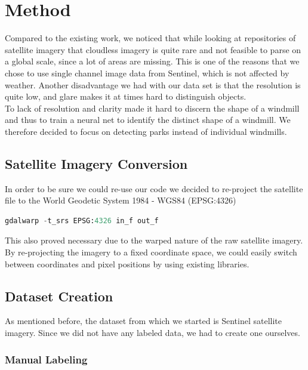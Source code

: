 \section{Method}
%

Compared to the existing work, we noticed that while looking at repositories of satellite imagery that cloudless imagery is quite rare and not feasible to parse on a global scale, since a lot of areas are missing. This is one of the reasons that we chose to use single channel image data from Sentinel, which is not affected by weather. Another disadvantage we had with our data set is that the resolution is quite low, and glare makes it at times hard to distinguish objects. \\

To lack of resolution and clarity made it hard to discern the shape of a windmill and thus to train a neural net to identify the distinct shape of a windmill. We therefore decided to focus on detecting parks instead of individual windmills.

\subsection{Satellite Imagery Conversion}

In order to be sure we could re-use our code we decided to re-project the satellite file to the World Geodetic System 1984 - WGS84 (EPSG:4326) 

\begin{lstlisting}[language=Python,breaklines=true]
gdalwarp -t_srs EPSG:4326 in_f out_f
\end{lstlisting}

This also proved necessary due to the warped nature of the raw satellite imagery. By re-projecting the imagery to a fixed coordinate space, we could easily switch between coordinates and pixel positions by using existing libraries. 

\subsection{Dataset Creation}

As mentioned before, the dataset from which we started is Sentinel satellite imagery. Since we did not have any labeled data, we had to create one ourselves.

\subsubsection{Manual Labeling}

